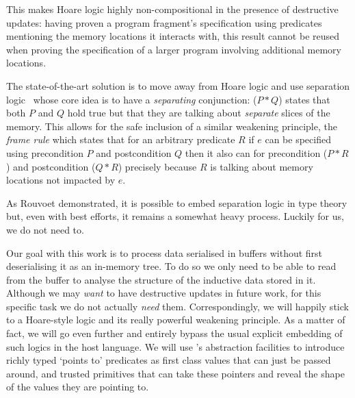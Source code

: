 This makes Hoare logic highly non-compositional in the presence of
destructive updates: having proven a program
fragment's specification using predicates mentioning the memory locations
it interacts with, this result cannot be reused when proving the specification
of a larger program involving additional memory locations.

The state-of-the-art solution is to move away from Hoare logic and use
separation logic~\citep{DBLP:conf/lics/Reynolds02,DBLP:journals/cacm/OHearn19,DBLP:books/hal/Chargueraud23,MANUAL:book/sfoundations/Chargueraud23}
whose core idea is to have a \emph{separating} conjunction: ($P \ast Q$)
states that both $P$ and $Q$ hold true but that they are talking about
\emph{separate} slices of the memory.
%
This allows for the safe inclusion of a similar weakening principle,
the \emph{frame rule} which states that for an arbitrary predicate $R$
if $e$ can be specified using precondition $P$ and postcondition $Q$
then it also can for precondition ($P \ast R$) and postcondition ($Q \ast R$)
precisely because $R$ is talking about memory locations not impacted by $e$.

As Rouvoet
demonstrated, it is possible to embed separation logic in
type theory but, even with best efforts, it remains a somewhat
heavy process. Luckily for us, we do not need to.

Our goal with this work is to process data serialised in buffers
without first deserialising it as an in-memory tree.
To do so we only need to be able to read from the buffer to
analyse the structure of the inductive data stored in it.
%
Although we may \emph{want} to have destructive updates in future
work, for this specific task we do not actually \emph{need} them.
%
Correspondingly, we will happily stick to a Hoare-style logic and
its really powerful weakening principle.
%
As a matter of fact, we will go even further and entirely bypass the
usual explicit embedding of such logics in the host language.
%
We will use \idris{}'s abstraction facilities to introduce richly typed
`points to' predicates as first class values that can just be passed
around, and trusted primitives that can take these pointers and reveal
the shape of the values they are pointing to.
